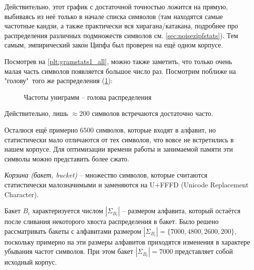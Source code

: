 Действительно, этот график с достаточной точностью ложится на прямую, выбиваясь из неё только в начале списка символов (там находятся самые частотные кандзи, а также практически вся хирагана/катакана, подробнее про распределения различных подмножеств символов см. \cref{sec:noisezipfstats}). Тем самым, эмпирический закон Ципфа был проверен на ещё одном корпусе.

Посмотрев на \cref{plt:gramstats1_all}, можно также заметить, что только очень малая часть символов появляется большое число раз. Посмотрим поближе на "голову"\ того же распределения (\cref{plt:gramstats1_head}):

\begin{figure}[H]
	\caption{Частоты униграмм -- голова распределения }
	\label{plt:gramstats1_head}
\end{figure}
Действительно, лишь $\approx 200$ символов встречаются достаточно часто.

Осталюся ещё примерно $6500$ символов, которые входят в алфавит, но статистически мало отличаются от тех символов, что вовсе не встретились в нашем корпусе. Для оптимизации времени работы и занимаемой памяти эти символы можно представить более сжато.

\begin{definition}
	{\textit{Корзина (бакет, bucket)}} -- множество символов, которые считаются статистически малозначимыми и заменяются на U+FFFD (Unicode Replacement Character).
\end{definition}

Бакет $B_i$ характеризуется числом $|\Sigma_{B_i}|$ -- размером алфавита, который остаётся после сливания некоторого хвоста распределения в бакет. Было решено рассматривать бакеты с алфавитами размером $|\Sigma_{B_i}| = \{ 7000, 4800, 2600, 200 \}$, поскольку примерно на эти размеры алфавитов приходятся изменения в характере убывания частот символов. При этом бакет $|\Sigma_{B_i}| = 7000$ представляет собой исходный корпус. 

